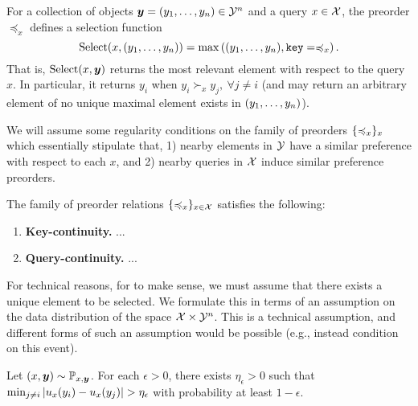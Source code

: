 \documentclass{article}
\begin{document}
For a collection of objects $\bm{y} = (y_1, \ldots, y_n) \in {\mathcal{Y}}^n$ and a query $x \in {\mathcal{X}}$, the preorder $\preceq_x$ defines a selection function
\begin{equation}\label{eq:def_selection}
  \mathrm{Select}(x, (y_1, \ldots, y_n)) = \max\left((y_1, \ldots, y_n), \mathtt{key}=\preccurlyeq_x\right).
\end{equation}
That is, $\mathrm{Select}(x, \bm{y})$ returns the most relevant element with respect to the query $x$. In particular, it returns $y_i$ when $y_i \succ_x y_j, \ \forall j \neq i$ (and may return an arbitrary element of no unique maximal element exists in $(y_1, \ldots, y_n)$).

We will assume some regularity conditions on the family of preorders $\{\preccurlyeq_x\}_x$ which essentially stipulate that, 1) nearby elements in ${\mathcal{Y}}$ have a similar preference with respect to each $x$, and 2) nearby queries in ${\mathcal{X}}$ induce similar preference preorders.

\begin{assumption}\label{ass:qk_cts}
  The family of preorder relations $\{\preccurlyeq_x\}_{x \in {\mathcal{X}}}$ satisfies the following:
  \begin{enumerate}
    \item \textbf{Key-continuity.} ...
    \item \textbf{Query-continuity.} ...
  \end{enumerate}
\end{assumption}

For technical reasons, for  to make sense, we must assume that there exists a unique element to be selected. We formulate this in terms of an assumption on the data distribution of the space ${\mathcal{X}} \times {\mathcal{Y}}^n$. This is a technical assumption, and different forms of such an assumption would be possible (e.g., instead condition on this event).
\begin{assumption}\label{ass:select_unique}
  Let $(x, \bm{y}) \sim {\mathbb{P}}_{x,\bm{y}}$. For each $\epsilon > 0$, there exists $\eta_\epsilon > 0$ such that $\min_{j \neq i} \left\lvert u_x(y_i) - u_x(y_j)\right\rvert > \eta_\epsilon$ with probability at least $1 - \epsilon$.
\end{assumption}

\end{document}

